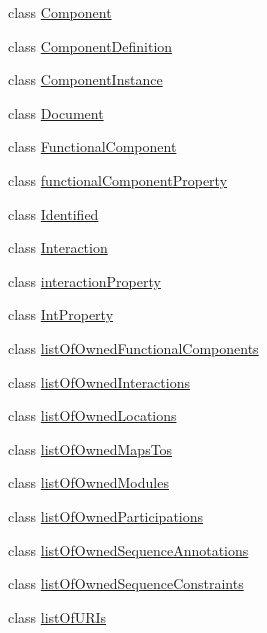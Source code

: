 \begin{DoxyCompactItemize}
\item 
class \hyperlink{classsbol_1_1libsbol_1_1_component}{Component}
\item 
class \hyperlink{classsbol_1_1libsbol_1_1_component_definition}{Component\+Definition}
\item 
class \hyperlink{classsbol_1_1libsbol_1_1_component_instance}{Component\+Instance}
\item 
class \hyperlink{classsbol_1_1libsbol_1_1_document}{Document}
\item 
class \hyperlink{classsbol_1_1libsbol_1_1_functional_component}{Functional\+Component}
\item 
class \hyperlink{classsbol_1_1libsbol_1_1functional_component_property}{functional\+Component\+Property}
\item 
class \hyperlink{classsbol_1_1libsbol_1_1_identified}{Identified}
\item 
class \hyperlink{classsbol_1_1libsbol_1_1_interaction}{Interaction}
\item 
class \hyperlink{classsbol_1_1libsbol_1_1interaction_property}{interaction\+Property}
\item 
class \hyperlink{classsbol_1_1libsbol_1_1_int_property}{Int\+Property}
\item 
class \hyperlink{classsbol_1_1libsbol_1_1list_of_owned_functional_components}{list\+Of\+Owned\+Functional\+Components}
\item 
class \hyperlink{classsbol_1_1libsbol_1_1list_of_owned_interactions}{list\+Of\+Owned\+Interactions}
\item 
class \hyperlink{classsbol_1_1libsbol_1_1list_of_owned_locations}{list\+Of\+Owned\+Locations}
\item 
class \hyperlink{classsbol_1_1libsbol_1_1list_of_owned_maps_tos}{list\+Of\+Owned\+Maps\+Tos}
\item 
class \hyperlink{classsbol_1_1libsbol_1_1list_of_owned_modules}{list\+Of\+Owned\+Modules}
\item 
class \hyperlink{classsbol_1_1libsbol_1_1list_of_owned_participations}{list\+Of\+Owned\+Participations}
\item 
class \hyperlink{classsbol_1_1libsbol_1_1list_of_owned_sequence_annotations}{list\+Of\+Owned\+Sequence\+Annotations}
\item 
class \hyperlink{classsbol_1_1libsbol_1_1list_of_owned_sequence_constraints}{list\+Of\+Owned\+Sequence\+Constraints}
\item 
class \hyperlink{classsbol_1_1libsbol_1_1list_of_u_r_is}{list\+Of\+U\+R\+Is}
\item 

\end{DoxyCompactItemize}
